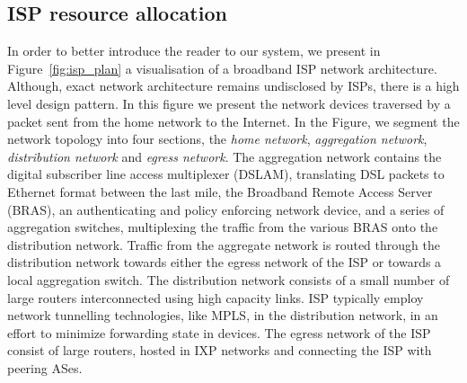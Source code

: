 \subsection{ISP resource allocation} \label{s:qos:motivation}


In order to better introduce the reader to our system, we present in
Figure~\ref{fig:isp_plan} a visualisation of a broadband ISP network
architecture.  Although, exact network architecture remains undisclosed by ISPs,
there is a high level design pattern. In this figure we present the network
devices traversed by a packet sent from the home network to the Internet.  In
the Figure, we segment the network topology into four sections, the {\it home
  network}, {\it aggregation network}, {\it distribution network} and {\it
  egress network}. The aggregation network contains the digital subscriber line
access multiplexer (DSLAM), translating DSL packets to Ethernet format between
the last mile,  the Broadband Remote Access Server (BRAS), an authenticating and
policy enforcing network device, and a series of aggregation switches,
multiplexing the traffic from the various BRAS onto the distribution network.
Traffic from the aggregate network is routed through the distribution network
towards either the egress network of the ISP or towards a local aggregation
switch. The distribution network consists of a small number of large routers
interconnected using high capacity links.  ISP typically employ network
tunnelling technologies, like MPLS, in the distribution network, in an effort to
minimize forwarding state in devices.  The egress network of the ISP consist of
large routers, hosted in IXP networks and connecting the ISP with peering ASes.

